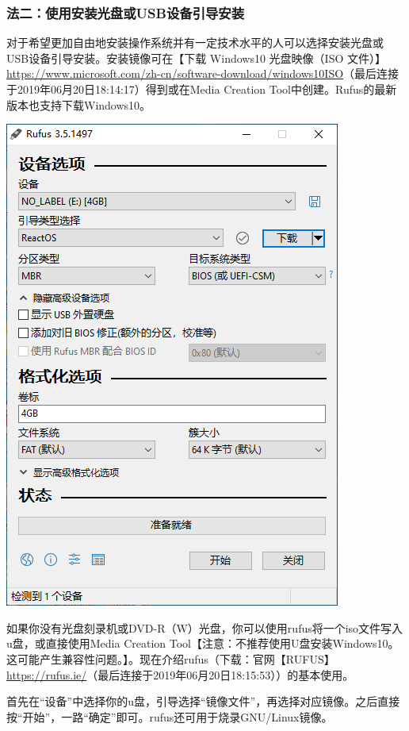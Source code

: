\subsubsection{法二：使用安装光盘或USB设备引导安装}
对于希望更加自由地安装操作系统并有一定技术水平的人可以选择安装光盘或USB设备引导安装。安装镜像可在【下载 Windows10 光盘映像（ISO 文件）】\url{https://www.microsoft.com/zh-cn/software-download/windows10ISO}（最后连接于2019年06月20日18:14:17）得到或在Media Creation Tool中创建。Rufus的最新版本也支持下载Windows10。
\begin{center}
	\includegraphics[scale=0.6]{pic/rufus}	
\end{center} \par
如果你没有光盘刻录机或DVD-R（W）光盘，你可以使用rufus将一个iso文件写入u盘，或直接使用Media Creation Tool【注意：不推荐使用U盘安装Windows10。这可能产生兼容性问题。】。现在介绍rufus（下载：官网【RUFUS】\url{https://rufus.ie/}（最后连接于2019年06月20日18:15:53））的基本使用。\par
首先在“设备”中选择你的u盘，引导选择“镜像文件”，再选择对应镜像。之后直接按“开始”，一路“确定”即可。rufus还可用于烧录GNU/Linux镜像。\par
